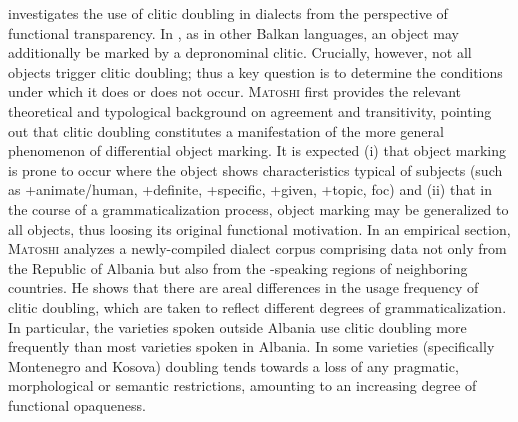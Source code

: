 \documentclass[output=paper,hidelinks]{langscibook}
\begin{document}
\textsc{} investigates the use of clitic doubling in  dialects from the perspective of functional transparency. In , as in other Balkan languages, an object may additionally be marked by a depronominal clitic. Crucially, however, not all objects trigger clitic doubling; thus a key question is to determine the conditions under which it does or does not occur. \textsc{Matoshi} first provides the relevant theoretical and typological background on agreement and transitivity, pointing out that  clitic doubling constitutes a manifestation of the more general phenomenon of differential object marking. It is expected (i) that object marking is prone to occur where the object shows characteristics typical of subjects (such as +animate/human, +definite, +specific, +given, +topic, \textminus{}foc) and (ii) that in the course of a grammaticalization process, object marking may be generalized to all objects, thus loosing its original functional motivation. In an empirical section, \textsc{Matoshi} analyzes a newly-compiled  dialect corpus comprising data not only from the Republic of Albania but also from the -speaking regions of neighboring countries. He shows that there are areal differences in the usage frequency of clitic doubling, which are taken to reflect different degrees of grammaticalization. In particular, the varieties spoken outside Albania use clitic doubling more frequently than most varieties spoken in Albania. In some varieties (specifically Montenegro and Kosova) doubling tends towards a loss of any pragmatic, morphological or semantic restrictions, amounting to an increasing degree of functional opaqueness.
\end{document}
